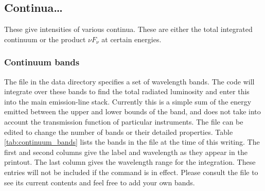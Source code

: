 \subsection{Continua\dots}

These give intensities of various continua.  These are either the total
integrated continuum or the product $\nu F_\nu$ at certain energies.

\subsubsection{Continuum bands}
The file  in the data directory
specifies a set of wavelength bands.
The code will integrate over these bands to find the
total radiated luminosity and enter this into the main emission-line stack.
Currently this is a simple sum of the energy emitted between the upper and
lower bounds of the band, and does not take into account the transmission function
of particular instruments.
The  file can be edited to change 
the number of bands or their detailed properties.
Table \ref{tab:continuum_bands} lists the bands in the file at the
time of this writing.
The first and second columns give
the label and wavelength as they appear in the printout.
The last column
gives the wavelength range for the integration.
These entries will not be included if the  command is in effect.
Please consult the file to see its current contents
and feel free to add your own bands.

